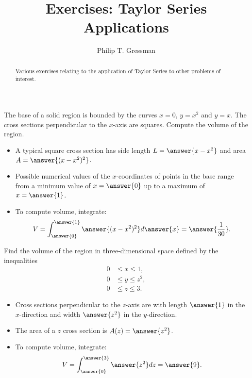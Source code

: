 \documentclass{ximera}
\title{Exercises: Taylor Series Applications}
\author{Philip T. Gressman}
\begin{document}
\begin{abstract}
Various exercises relating to the application of Taylor Series to other problems of interest.
\end{abstract}
\maketitle

\begin{exercise}
The base of a solid region is bounded by the curves $x = 0$, $y = x^2$ and $y = x$. The cross sections perpendicular to the $x$-axis are squares. Compute the volume of the region.
\begin{itemize}
\item A typical square cross section has side length $L = \answer{x - x^2}$ and area $A = \answer{(x-x^2)^2}$. 
\item Possible numerical values of the $x$-coordinates of points in the base range from a minimum value of $x = \answer{0}$ up to a maximum of $x = \answer{1}$.
\item To compute volume, integrate:
\[ V = \int_{\answer{0}}^{\answer{1}} \answer{(x-x^2)^2} d\answer{x} = \answer{\frac{1}{30}}. \]
\end{itemize}
\end{exercise}

\begin{exercise}
Find the volume of the region in three-dimensional space defined by the inequalities
\begin{align*}
0 & \leq x \leq 1, \\
0 & \leq y \leq z^2, \\
0 & \leq z \leq 3.
\end{align*}
\begin{itemize}
\item Cross sections perpendicular to the $z$-axis are  with length $\answer{1}$ in the $x$-direction and width $\answer{z^2}$ in the $y$-direction.
\item The area of a $z$ cross section is $A(z) = \answer{z^2}$.
\item To compute volume, integrate:
\[ V = \int_{\answer{0}}^{\answer{3}} \answer{z^2} dz = \answer{9}. \]
\end{itemize}
\end{exercise}
\end{document}
